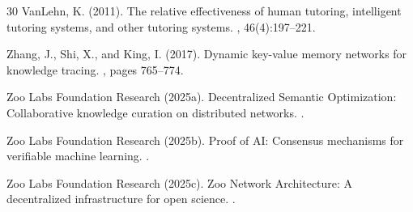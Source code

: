 \begin{thebibliography}{30}
VanLehn, K. (2011).
\newblock The relative effectiveness of human tutoring, intelligent tutoring systems, and other tutoring systems.
, 46(4):197--221.

Zhang, J., Shi, X., and King, I. (2017).
\newblock Dynamic key-value memory networks for knowledge tracing.
, pages 765--774.

Zoo Labs Foundation Research (2025a).
\newblock Decentralized Semantic Optimization: Collaborative knowledge curation on distributed networks.
.

Zoo Labs Foundation Research (2025b).
\newblock Proof of AI: Consensus mechanisms for verifiable machine learning.
.

Zoo Labs Foundation Research (2025c).
\newblock Zoo Network Architecture: A decentralized infrastructure for open science.
.

\end{thebibliography}

